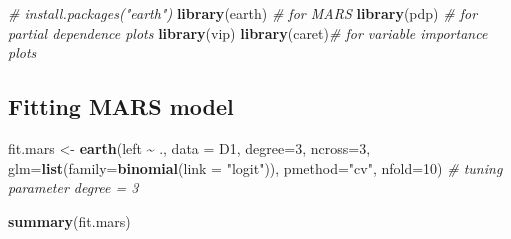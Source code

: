 \documentclass[
  11pt,
]{article}
\newenvironment{Shaded}{\begin{snugshade}}{\end{snugshade}}
\newcommand{\AttributeTok}[1]{\textcolor[rgb]{0.13,0.29,0.53}{#1}}
\newcommand{\CommentTok}[1]{\textcolor[rgb]{0.56,0.35,0.01}{\textit{#1}}}
\newcommand{\DecValTok}[1]{\textcolor[rgb]{0.00,0.00,0.81}{#1}}
\newcommand{\FunctionTok}[1]{\textcolor[rgb]{0.13,0.29,0.53}{\textbf{#1}}}
\newcommand{\NormalTok}[1]{#1}
\newcommand{\OtherTok}[1]{\textcolor[rgb]{0.56,0.35,0.01}{#1}}
\newcommand{\SpecialCharTok}[1]{\textcolor[rgb]{0.81,0.36,0.00}{\textbf{#1}}}
\newcommand{\StringTok}[1]{\textcolor[rgb]{0.31,0.60,0.02}{#1}}
\begin{document}
\begin{Shaded}
\begin{Highlighting}[]
\CommentTok{\# install.packages("earth")}
\FunctionTok{library}\NormalTok{(earth)    }\CommentTok{\# for MARS}
\FunctionTok{library}\NormalTok{(pdp)      }\CommentTok{\# for partial dependence plots}
\FunctionTok{library}\NormalTok{(vip)  }
\FunctionTok{library}\NormalTok{(caret)}\CommentTok{\# for variable importance plots}
\end{Highlighting}
\end{Shaded}

\subsection{Fitting MARS model}

\begin{Shaded}
\begin{Highlighting}[]
\NormalTok{fit.mars }\OtherTok{\textless{}{-}} \FunctionTok{earth}\NormalTok{(left }\SpecialCharTok{\textasciitilde{}}\NormalTok{ .,  }\AttributeTok{data =}\NormalTok{ D1, }\AttributeTok{degree=}\DecValTok{3}\NormalTok{, }\AttributeTok{ncross=}\DecValTok{3}\NormalTok{,}
    \AttributeTok{glm=}\FunctionTok{list}\NormalTok{(}\AttributeTok{family=}\FunctionTok{binomial}\NormalTok{(}\AttributeTok{link =} \StringTok{"logit"}\NormalTok{)), }
    \AttributeTok{pmethod=}\StringTok{"cv"}\NormalTok{, }\AttributeTok{nfold=}\DecValTok{10}\NormalTok{) }\CommentTok{\# tuning parameter degree = 3}

\FunctionTok{summary}\NormalTok{(fit.mars)}
\end{Highlighting}
\end{Shaded}
\end{document}
